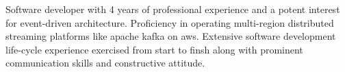 \begin{cvletter}


Software developer with 4 years of professional experience and a potent interest for event-driven architecture. Proficiency in operating multi-region distributed streaming platforms like apache kafka on aws. Extensive software development life-cycle experience exercised from start to finsh along with prominent communication skills and constructive attitude. %


\end{cvletter}